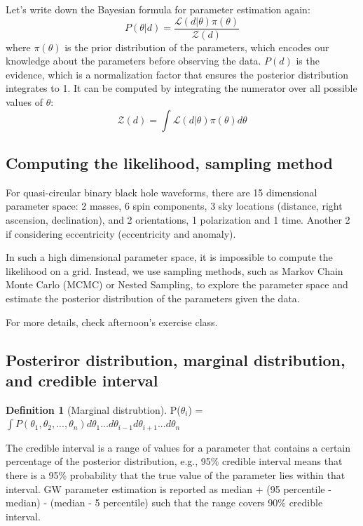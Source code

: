 \documentclass[12pt, a4paper]{article}
\newcounter{lecture}              %
\theoremstyle{plain} %
\theoremstyle{definition} %
\newtheorem{definition}{Definition}[lecture]
\begin{document}
Let's write down the Bayesian formula for parameter estimation again:
\begin{equation}
    P(\theta|d) = \frac{\mathcal{L}(d|\theta) \pi(\theta)}{\mathcal{Z}(d)}
\end{equation}
where $\pi(\theta)$ is the prior distribution of the parameters, which encodes our knowledge about the parameters before observing the data. $P(d)$ is the evidence, which is a normalization factor that ensures the posterior distribution integrates to 1. It can be computed by integrating the numerator over all possible values of $\theta$:
\begin{equation}
    \mathcal{Z}(d) = \int \mathcal{L}(d|\theta) \pi(\theta) d\theta
\end{equation}

\subsection*{Computing the likelihood, sampling method}

For quasi-circular binary black hole waveforms, there are 15 dimensional parameter space: 2 masses, 6 spin components, 3 sky locations (distance, right ascension, declination), and 2 orientations, 1 polarization and 1 time. Another 2 if considering eccentricity (eccentricity and anomaly).

In such a high dimensional parameter space, it is impossible to compute the likelihood on a grid. Instead, we use sampling methods, such as Markov Chain Monte Carlo (MCMC) or Nested Sampling, to explore the parameter space and estimate the posterior distribution of the parameters given the data.

For more details, check afternoon's exercise class.

\subsection*{Posteriror distribution, marginal distribution, and credible interval}

\begin{definition}[Marginal distrubtion]
    P($\theta_i$) = $\int P(\theta_1, \theta_2, ..., \theta_n) d\theta_1 ... d\theta_{i-1} d\theta_{i+1} ... d\theta_n$
\end{definition}

The credible interval is a range of values for a parameter that contains a certain percentage of the posterior distribution, e.g., 95\% credible interval means that there is a 95\% probability that the true value of the parameter lies within that interval.
GW parameter estimation is reported as median + (95 percentile - median) - (median - 5 percentile) such that the range covers 90\% credible interval.
\end{document}
